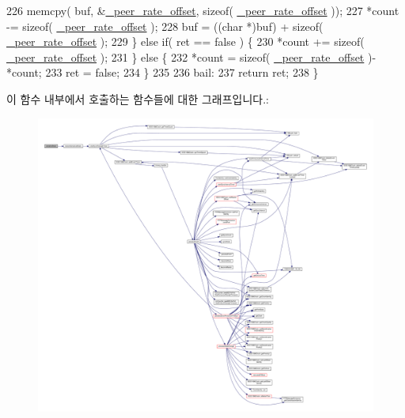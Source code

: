 \begin{DoxyCode}
226         memcpy( buf, &\hyperlink{class_common_port_a43c379422577226fdb4f3d0992c3bcea}{\_peer\_rate\_offset}, \textcolor{keyword}{sizeof}( 
      \hyperlink{class_common_port_a43c379422577226fdb4f3d0992c3bcea}{\_peer\_rate\_offset} ));
227         *count -= \textcolor{keyword}{sizeof}( \hyperlink{class_common_port_a43c379422577226fdb4f3d0992c3bcea}{\_peer\_rate\_offset} );
228         buf = ((\textcolor{keywordtype}{char} *)buf) + \textcolor{keyword}{sizeof}( \hyperlink{class_common_port_a43c379422577226fdb4f3d0992c3bcea}{\_peer\_rate\_offset} );
229     \} \textcolor{keywordflow}{else} \textcolor{keywordflow}{if}( ret == \textcolor{keyword}{false} ) \{
230         *count += \textcolor{keyword}{sizeof}( \hyperlink{class_common_port_a43c379422577226fdb4f3d0992c3bcea}{\_peer\_rate\_offset} );
231     \} \textcolor{keywordflow}{else} \{
232         *count = \textcolor{keyword}{sizeof}( \hyperlink{class_common_port_a43c379422577226fdb4f3d0992c3bcea}{\_peer\_rate\_offset} )-*count;
233         ret = \textcolor{keyword}{false};
234     \}
235 
236  bail:
237     \textcolor{keywordflow}{return} ret;
238 \}
\end{DoxyCode}


이 함수 내부에서 호출하는 함수들에 대한 그래프입니다.\+:
\nopagebreak
\begin{figure}[H]
\begin{center}
\leavevmode
\includegraphics[width=350pt]{class_common_port_a7ae77a9c4cc2f66b95fe47a58b571113_cgraph}
\end{center}
\end{figure}




